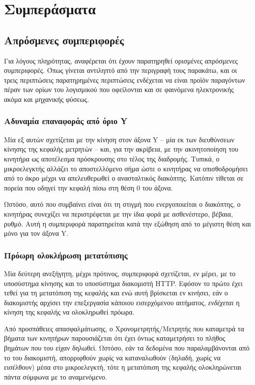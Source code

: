 \chapter{Συμπεράσματα}


\section{Απρόσμενες συμπεριφορές}

Για λόγους πληρότητας, αναφέρεται ότι έχουν παρατηρηθεί ορισμένες απρόσμενες
συμπεριφορές. Όπως γίνεται αντιληπτό από την περιγραφή τους παρακάτω, και οι
τρεις περιπτώσεις παρατηρημένες περιπτώσεις ενδέχεται να είναι προϊόν παραγόντων
πέραν των ορίων του λογισμικού που οφείλονται και σε φαινόμενα ηλεκτρονικής
ακόμα και μηχανικής φύσεως.


\subsection*{Αδυναμία επαναφοράς από όριο Y\protect{}}

Μία εξ αυτών σχετίζεται με την κίνηση στον άξονα Y -- μία εκ των διευθύνσεων
κίνησης της κεφαλής μετρητών -- και, για την ακρίβεια, με την ακινητοποίηση του
κινητήρα ως αποτέλεσμα πρόσκρουσης στο τέλος της διαδρομής. Τυπικά, ο
μικροελεγκτής αλλάζει το αποστελλόμενο σήμα ώστε ο κινητήρας να οπισθοδρομήσει
από το άκρο μέχρι να απελευθερωθεί ο ανασταλτικός διακόπτης. Κατόπιν τίθεται σε
πορεία που οδηγεί την κεφαλή πίσω στη θέση 0 του άξονα.

Ωστόσο, αυτό που συμβαίνει είναι ότι τη στιγμή που ενεργοποιείται ο διακόπτης,
ο κινητήρας συνεχίζει να περιστρέφεται με την ίδια φορά με ασθενέστερο, βέβαια,
ρυθμό. Αυτή η συμπεριφορά παρατηρείται κατά την εξώθηση από το μέγιστη θέση και
μόνο για τον άξονα Y.


\subsection*{Πρόωρη ολοκλήρωση μετατόπισης}

Μία δεύτερη ανεξήγητη, μέχρι πρότινος, συμπεριφορά σχετίζεται, εν μέρει, με το
υποσύστημα κίνησης και το υποσύστημα διακομιστή HTTP. Εφόσον το πρώτο έχει
τεθεί για τη μετατόπιση της κεφαλής και ενώ αυτή βρίσκεται εν κινήσει, εάν ο
διακομιστής αρχίσει την επεξεργασία κάποιου εισερχόμενου αιτήματος,
\emph{ενδέχεται} η κίνηση της κεφαλής να ολοκληρωθεί πρόωρα.

Από προσπάθειες απασφαλμάτωσης, ο Χρονομετρητής\slash{}Μετρητής που καταμετρά
τα βήματα των κινητήρων παρουσιάζεται ότι έχει όντως καταμετρήσει το πλήθος
βημάτων που του είχαν δηλωθεί. Ωστόσο, εάν τα δεδομένα που παραλαμβάνονται από
το  του διακομιστή, απορριφθούν χωρίς να καταναλωθούν (δηλαδή, χωρίς
να εισέλθουν) μέσα στο μικροελεγκτή, τότε η μετατόπιση της κεφαλής ολοκληρώνεται
πάντα σύμφωνα με το αναμενόμενο.

